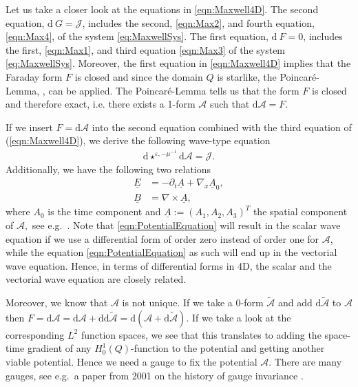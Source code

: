 \documentclass[a4paper,11pt]{article}
\renewcommand{\vec}[1]{\underline{#1}}
\begin{document}
{	Let us take a closer look at the equations in \eqref{eqn:Maxwell4D}.   The second equation, $\mathrm{d}\ G = \mathcal{J}$,  includes the second, \eqref{eqn:Max2}, and fourth equation, \eqref{eqn:Max4}, of the system \eqref{eq:MaxwellSys}. The first equation, $\mathrm{d}\ F = 0$,  includes the first, \eqref{eqn:Max1}, and third equation \eqref{eqn:Max3} of the system \eqref{eq:MaxwellSys}. }
Moreover, the first equation in \eqref{eqn:Maxwell4D} implies that the Faraday form $F$ is closed and since the domain $Q$ is starlike, the Poincaré-Lemma, \cite[Thm.~4.1]{lang}, can be {applied}. The Poincar\'{e}-Lemma tells us that the form $F$ is closed and therefore exact, i.e. there exists a 1-form $\mathcal A$ such that $\mathrm{d}\mathcal A = F.$

If we insert $F = \mathrm{d}\mathcal A$ into the second equation combined with the third equation of (\ref{eqn:Maxwell4D}), we derive the following wave-type equation
\begin{align}
	\label{eqn:PotentialEquation}
	\mathrm{d} \star^{\varepsilon,-\mu^{-1}} \mathrm{d} \mathcal A =  \mathcal{J}.
\end{align}
Additionally, we have the following two relations
\begin{align*}
	\vec E &= -\partial_t \underline{A} +\nabla_x \vec A_0,\\
	\vec B &= \nabla\times\underline{A},
\end{align*}
where $A_0$  is the time component and $\underline{A}:=(A_1,A_2,A_3)^T$ the spatial component of $\mathcal A,$ see e.g.~\cite[p.~389]{fortney}. 
Note that \eqref{eqn:PotentialEquation} will result in the scalar wave equation if we use a differential form of order zero instead of order one for $\mathcal A$, while the equation \eqref{eqn:PotentialEquation} as such will end up in the vectorial wave equation. Hence, in terms of differential forms in 4D, the scalar and the vectorial wave equation are closely related.

Moreover, we know that $\mathcal A$ is not unique. If we take a 0-form $\tilde{\mathcal A}$ and add $\mathrm{d}\tilde{\mathcal A}$ to $\mathcal A$ then $F=\mathrm{d}\mathcal A=\mathrm{d}\mathcal A+	\mathrm{d}\mathrm{d}\tilde{\mathcal A} = \mathrm{d}(\mathcal A+\mathrm{d}\tilde{\mathcal A})$. If we take a look at the corresponding $L^2$ {function spaces}, we see that this translates to adding the space-time gradient of any $H^1_0(Q)$-function to the potential and getting another viable potential. Hence we need a gauge to fix the potential $\mathcal A$. There are many gauges, see e.g.~a paper from 2001 on the history of gauge invariance \cite{jackson2001historical}. 
\end{document}
